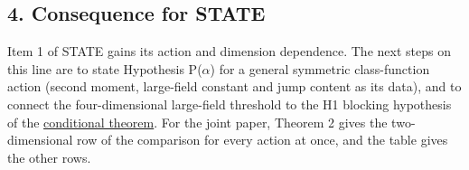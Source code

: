 \documentclass[11pt,a4paper]{article}
\begin{document}
\hypertarget{consequence-for-state}{%
\subsection{4. Consequence for STATE}\label{consequence-for-state}}

Item 1 of STATE gains its action and dimension dependence. The next
steps on this line are to state Hypothesis P(\(\alpha\)) for a general
symmetric class-function action (second moment, large-field constant and
jump content as its data), and to connect the four-dimensional
large-field threshold to the H1 blocking hypothesis of the
\href{mass-gap-conditional-theorem.md}{conditional theorem}. For the
joint paper, Theorem 2 gives the two-dimensional row of the comparison
for every action at once, and the table gives the other rows.
\end{document}
